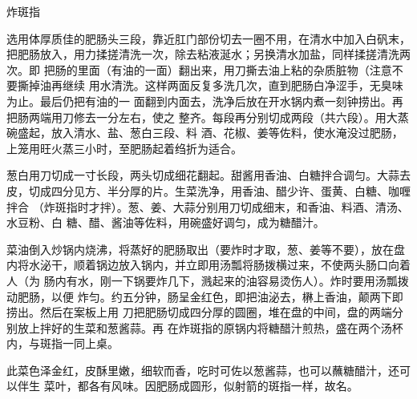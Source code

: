 \begin{recipe}{炸斑指}

\ingredients


\preparation

\step 选用体厚质佳的肥肠头三段，靠近肛门部份切去一圈不用，在清水中加入白矾末，
把肥肠放入，用力揉搓清洗一次，除去粘液涎水；另换清水加盐，同样揉搓清洗两次。即
把肠的里面（有油的一面）翻出来，用刀撕去油上粘的杂质脏物（注意不要撕掉油再继续
用水清洗。这样两面反复多洗几次，直到肥肠白净涩手，无臭味为止。最后仍把有油的一
面翻到内面去，洗净后放在开水锅内煮一刻钟捞出。再把肠两端用刀修去一分左右，使之
整齐。每段再分别切成两段（共六段）。用大蒸碗盛起，放入清水、盐、葱白三段、料
酒、花椒、姜等佐料，使水淹没过肥肠，上笼用旺火蒸三小时，至肥肠起着绉折为适合。

\step 葱白用刀切成一寸长段，两头切成细花翻起。甜酱用香油、白糖拌合调匀。大蒜去
皮，切成四分见方、半分厚的片。生菜洗净，用香油、醋少许、蛋黄、白糖、咖喱拌合
（炸斑指时才拌）。葱、姜、大蒜分别用刀切成细末，和香油、料酒、清汤、水豆粉、白
糖、醋、酱油等佐料，用碗盛好调匀，成为糖醋汁。

\step 菜油倒入炒锅内烧沸，将蒸好的肥肠取出（要炸时才取，葱、姜等不要），放在盘
内将水泌干，顺着锅边放入锅内，并立即用汤瓢将肠拨横过来，不使两头肠口向着人（为
肠内有水，刚一下锅要炸几下，溅起来的油容易烫伤人）。炸时要用汤瓢拨动肥肠，以便
炸匀。约五分钟，肠呈金红色，即把油泌去，楙上香油，颠两下即捞出。然后在案板上用
刀把肥肠切成四分厚的圆圈，堆在盘的中间，盘的两端分别放上拌好的生菜和葱酱蒜。再
在炸斑指的原锅内将糖醋汁煎热，盛在两个汤杯内，与斑指一同上桌。

\features

此菜色泽金红，皮酥里嫩，细软而香，吃时可佐以葱酱蒜，也可以蘸糖醋汁，还可以伴生
菜叶，都各有风味。因肥肠成圆形，似射箭的斑指一样，故名。

\end{recipe}

